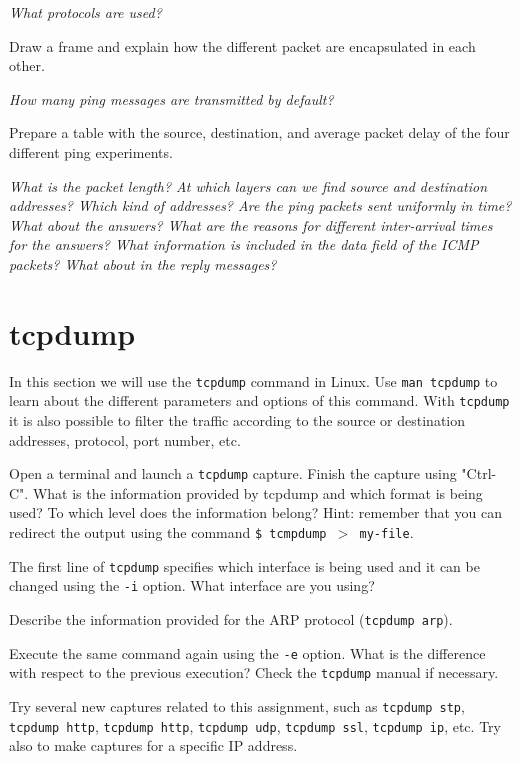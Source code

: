 \emph{What protocols are used?}

Draw a frame and explain how the different packet are encapsulated in each other.

\emph{How many ping messages are transmitted by default?}

Prepare a table with the source, destination, and average packet delay  of the four different ping experiments.

\emph{What is the packet length? At which layers can we find source and destination addresses? Which kind of addresses? Are the ping packets sent uniformly in time? What about the answers? What are the reasons for different inter-arrival times for the answers? What information is included in the data field of the ICMP packets? What about in the reply messages?}

\section{tcpdump}

In this section we will use the \texttt{tcpdump} command in Linux. Use \texttt{man tcpdump} to learn about the different parameters and options of this command. With \texttt{tcpdump} it is also possible to filter the traffic according to the source or destination addresses, protocol, port number, etc.

Open a terminal and launch a \texttt{tcpdump} capture. Finish the capture using "Ctrl-C". What is the information provided by tcpdump and which format is being used? To which level does the information belong? Hint: remember that you can redirect the output using the command \texttt{\$ tcmpdump $>$ my-file}.

The first line of \texttt{tcpdump} specifies which interface is being used and it can be changed using the \texttt{-i} option. What interface are you using?

Describe the information provided for the ARP protocol (\texttt{tcpdump arp}).

Execute the same command again using the \texttt{-e} option. What is the difference with respect to the previous execution? Check the \texttt{tcpdump} manual if necessary.

Try several new captures related to this assignment, such as \texttt{tcpdump stp}, \texttt{tcpdump http}, \texttt{tcpdump http}, \texttt{tcpdump udp}, \texttt{tcpdump ssl}, \texttt{tcpdump ip}, etc. Try also to make captures for a specific IP address.
